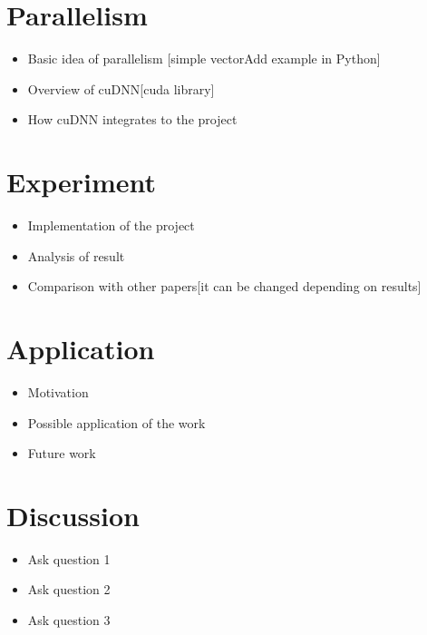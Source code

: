 \documentclass[11pt]{article}       %
\newenvironment{slide}[1]        {\section{#1} \begin{itemize}}%
                                 {\end{itemize}}
\begin{document}
\begin{slide}{Parallelism}
\item Basic idea of parallelism [simple vectorAdd example in Python]
\item Overview of cuDNN[cuda library] 
\item How cuDNN integrates to the project
\end{slide}

\begin{slide}{Experiment}
\item Implementation of the project
\item Analysis of result
\item Comparison with other papers[it can be changed depending on results]
\end{slide}

\begin{slide}{Application}
\item Motivation
\item Possible application of the work 
\item Future work
\end{slide}

\begin{slide}{Discussion}
\item Ask question 1
\item Ask question 2
\item Ask question 3
\end{slide}


\end{document}
